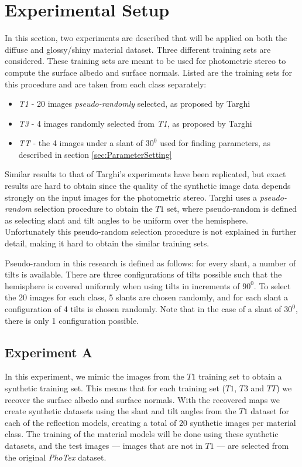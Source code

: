 \section{Experimental Setup}\label{sec:Experiments}
In this section, two experiments are described that will be applied on both the diffuse and glossy/shiny material dataset. Three different training sets are considered. These training sets are meant to be used for photometric stereo to compute the surface albedo and surface normals. Listed are the training sets for this procedure and are taken from each class separately:

\begin{itemize}
	\item{\textit{T1} - 20 images {\it pseudo-randomly} selected, as proposed by Targhi}
	\item{\textit{T3} - 4 images randomly selected from \textit{T1}, as proposed by Targhi}
	\item{\textit{TT} - the 4 images under a slant of $30^0$ used for finding parameters, as described in section \ref{sec:ParameterSetting}}
\end{itemize}

Similar results to that of Targhi's experiments have been replicated, but exact results are hard to obtain since the quality of the synthetic image data depends strongly on the input images for the photometric stereo. Targhi uses a {\it pseudo-random} selection procedure to obtain the $T1$ set, where pseudo-random is defined as selecting slant and tilt angles to be uniform over the hemisphere. Unfortunately this pseudo-random selection procedure is not explained in further detail, making it hard to obtain the similar training sets.

Pseudo-random in this research is defined as follows: for every slant, a number of tilts is available. There are three configurations of tilts possible such that the hemisphere is covered uniformly when using tilts in increments of $90^0$. To select the 20 images for each class, 5 slants are chosen randomly, and for each slant a configuration of 4 tilts is chosen randomly. Note that in the case of a slant of $30^0$, there is only 1 configuration possible. 

\subsection{Experiment A}
In this experiment, we mimic the images from the $T1$ training set to obtain a synthetic training set. This means that for each training set ($T1$, $T3$ and $TT$) we recover the surface albedo and surface normals. With the recovered maps we create synthetic datasets using the slant and tilt angles from the $T1$ dataset for each of the reflection models, creating a total of 20 synthetic images per material class. The training of the material models will be done using these synthetic datasets, and the test images --- images that are not in $T1$ --- are selected from the original {\it PhoTex} dataset.

